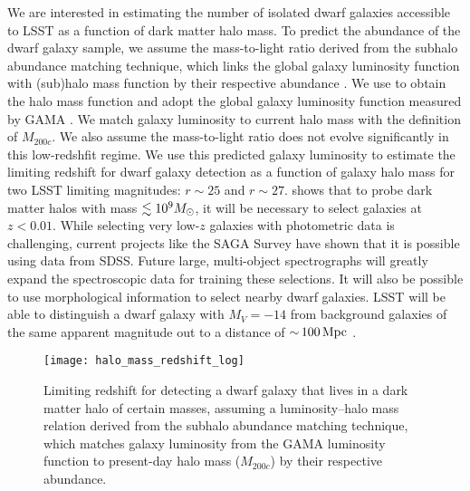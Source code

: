 \vspace{1em} 

We are interested in estimating the number of isolated dwarf galaxies accessible to LSST as a function of dark matter halo mass.
To predict the abundance of the dwarf galaxy sample, we assume the mass-to-light ratio derived from the subhalo abundance matching technique, which links the global galaxy luminosity function with (sub)halo mass function by their respective abundance \citep[\eg,][]{2004ApJ...609...35K,2013ApJ...771...30R}. We use  \citep{2018ApJS..239...35D} to obtain the halo mass function and adopt the global galaxy luminosity function measured by GAMA \citep{2015MNRAS.451.1540L}. We match galaxy luminosity to current halo mass with the definition of $M_{200c}$. We also assume the mass-to-light ratio does not evolve significantly in this low-redshfit regime. 
We use this predicted galaxy luminosity to estimate the limiting redshift for dwarf galaxy detection as a function of galaxy halo mass for two LSST limiting magnitudes: $r \sim 25$ and $r \sim 27$. 
 shows that to probe dark matter halos with mass $\lesssim 10^9 M_\odot$, it will be necessary to select galaxies at $z < 0.01$. 
While selecting very low-$z$ galaxies with photometric data is challenging, current projects like the SAGA Survey \citep{Geha:2017} have shown that it is possible using data from SDSS. 
Future large, multi-object spectrographs will greatly expand the spectroscopic data for training these selections. 
It will also be possible to use morphological information to select nearby dwarf galaxies.
LSST will be able to distinguish a dwarf galaxy with $M_V=-14$ from background galaxies of the same apparent magnitude out to a distance of $ {\sim}\, 100 \mathrm{\,Mpc}$ \citep[Section 9 of][]{0912.0201}.

\begin{figure}
\centering
\texttt{[image: halo\_mass\_redshift\_log]}
\caption{\label{fig:dwarf_redshift} Limiting redshift for detecting a dwarf galaxy that lives in a dark matter halo of certain masses, assuming a luminosity--halo mass relation derived from the  subhalo abundance matching technique, which matches galaxy luminosity from the GAMA luminosity function to present-day halo mass ($M_{200c}$) by their respective abundance.}
\end{figure}

\vspace{1em} 

